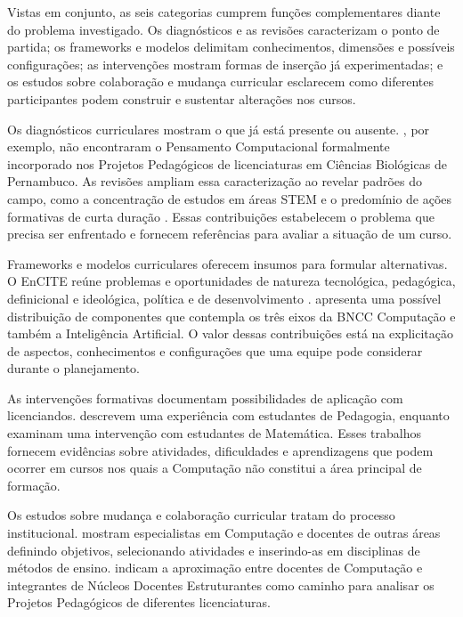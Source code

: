 Vistas em conjunto, as seis categorias cumprem funções complementares diante do problema investigado. Os diagnósticos e as revisões caracterizam o ponto de partida; os frameworks e modelos delimitam conhecimentos, dimensões e possíveis configurações; as intervenções mostram formas de inserção já experimentadas; e os estudos sobre colaboração e mudança curricular esclarecem como diferentes participantes podem construir e sustentar alterações nos cursos.

Os diagnósticos curriculares mostram o que já está presente ou ausente. , por exemplo, não encontraram o Pensamento Computacional formalmente incorporado nos Projetos Pedagógicos de licenciaturas em Ciências Biológicas de Pernambuco. As revisões ampliam essa caracterização ao revelar padrões do campo, como a concentração de estudos em áreas STEM e o predomínio de ações formativas de curta duração \cite{listiaji2025integrating}. Essas contribuições estabelecem o problema que precisa ser enfrentado e fornecem referências para avaliar a situação de um curso.

Frameworks e modelos curriculares oferecem insumos para formular alternativas. O EnCITE reúne problemas e oportunidades de natureza tecnológica, pedagógica, definicional e ideológica, política e de desenvolvimento \cite{vogel2024encite}.  apresenta uma possível distribuição de componentes que contempla os três eixos da BNCC Computação e também a Inteligência Artificial. O valor dessas contribuições está na explicitação de aspectos, conhecimentos e configurações que uma equipe pode considerar durante o planejamento.

As intervenções formativas documentam possibilidades de aplicação com licenciandos.  descrevem uma experiência com estudantes de Pedagogia, enquanto  examinam uma intervenção com estudantes de Matemática. Esses trabalhos fornecem evidências sobre atividades, dificuldades e aprendizagens que podem ocorrer em cursos nos quais a Computação não constitui a área principal de formação.

Os estudos sobre mudança e colaboração curricular tratam do processo institucional.  mostram especialistas em Computação e docentes de outras áreas definindo objetivos, selecionando atividades e inserindo-as em disciplinas de métodos de ensino.  indicam a aproximação entre docentes de Computação e integrantes de Núcleos Docentes Estruturantes como caminho para analisar os Projetos Pedagógicos de diferentes licenciaturas.


